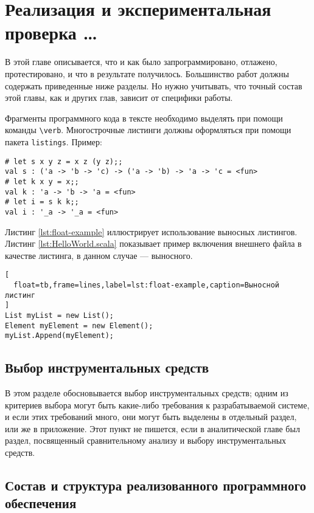 \chapter{Реализация и экспериментальная проверка \dots}

В этой главе описывается, что и как было запрограммировано, отлажено, 
протестировано, и что в результате получилось. Большинство работ должны 
содержать приведенные ниже разделы. Но нужно учитывать, что точный состав 
этой главы, как и других глав, зависит от специфики работы.

Фрагменты программного кода в тексте необходимо выделять при помощи команды 
\verb|\verb|. Многострочные листинги должны оформляться при помощи пакета 
\verb|listings|. Пример:

\begin{lstlisting}
# let s x y z = x z (y z);;
val s : ('a -> 'b -> 'c) -> ('a -> 'b) -> 'a -> 'c = <fun>
# let k x y = x;;
val k : 'a -> 'b -> 'a = <fun>
# let i = s k k;;
val i : '_a -> '_a = <fun>
\end{lstlisting}

Листинг \ref{lst:float-example} иллюстрирует использование выносных листингов.
Листинг \ref{lst:HelloWorld.scala} показывает пример включения внешнего файла 
в качестве листинга, в данном случае --- выносного.

\begin{lstlisting}[
  float=tb,frame=lines,label=lst:float-example,caption=Выносной листинг
]
List myList = new List();
Element myElement = new Element();
myList.Append(myElement);
\end{lstlisting}



\section{Выбор инструментальных средств}

В этом разделе обосновывается выбор инструментальных средств; одним из критериев выбора могут быть какие-либо требования к разрабатываемой системе, и если этих требований много, они могут быть выделены в отдельный раздел, или же в приложение. Этот пункт не пишется, если в аналитической главе был раздел, посвященный сравнительному анализу и выбору инструментальных средств.




\section{Состав и структура реализованного программного обеспечения}

